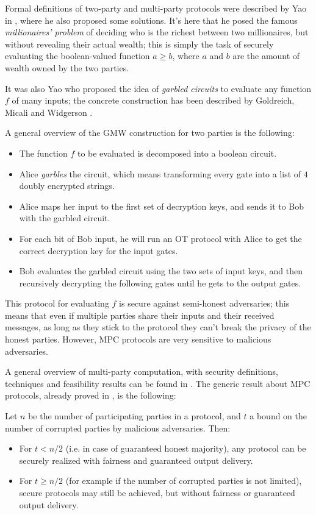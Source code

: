 Formal definitions of two-party and multi-party protocols were described by Yao in \cite{Yao_1, Yao_2}, where he also proposed some solutions. It's here that he posed the famous \emph{millionaires' problem} of deciding who is the richest between two millionaires, but without revealing their actual wealth; this is simply the task of securely evaluating the boolean-valued function $a\ge b$, where $a$ and $b$ are the amount of wealth owned by the two parties.

It was also Yao who proposed the idea of \emph{garbled circuits} to evaluate any function $f$ of many inputs; the concrete construction has been described by Goldreich, Micali and Widgerson \cite{GMW}.

A general overview of the GMW construction for two parties is the following:
\begin{itemize}
    \item The function $f$ to be evaluated is decomposed into a boolean circuit.
    \item Alice \emph{garbles} the circuit, which means transforming every gate into a list of $4$ doubly encrypted strings.
    \item Alice maps her input to the first set of decryption keys, and sends it to Bob with the garbled circuit.
    \item For each bit of Bob input, he will run an OT protocol with Alice to get the correct decryption key for the input gates.
    \item Bob evaluates the garbled circuit using the two sets of input keys, and then recursively decrypting the following gates until he gets to the output gates.
\end{itemize}

This protocol for evaluating $f$ is secure against semi-honest adversaries; this means that even if multiple parties share their inputs and their received messages, as long as they stick to the protocol they can't break the privacy of the honest parties. However, MPC protocols are very sensitive to malicious adversaries.

A general overview of multi-party computation, with security definitions, techniques and feasibility results can be found in \cite{Lindell_MPC}. The generic result about MPC protocols, already proved in \cite{GMW}, is the following:
\begin{theorem}
    Let $n$ be the number of participating parties in a protocol, and $t$ a bound on the number of corrupted parties by malicious adversaries. Then:
    \begin{itemize}
        \item For $t<n/2$ (i.e. in case of guaranteed honest majority), any protocol can be securely realized with fairness and guaranteed output delivery.
        \item For $t\ge n/2$ (for example if the number of corrupted parties is not limited), secure protocols may still be achieved, but without fairness or guaranteed output delivery.
    \end{itemize}
\end{theorem}

